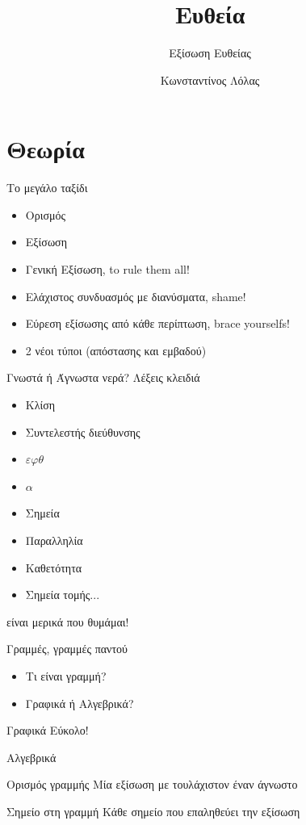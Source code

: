 \documentclass{presentation}
\title{Ευθεία}
\subtitle{Εξίσωση Ευθείας}
\author[Λόλας]{Κωνσταντίνος Λόλας}
\date{}
\begin{document}
\begin{frame}
  \titlepage
\end{frame}

\section{Θεωρία}

\begin{frame}{Το μεγάλο ταξίδι}
  \begin{itemize}[<+->]
    \item Ορισμός
    \item Εξίσωση
    \item Γενική Εξίσωση, to rule them all!
    \item Ελάχιστος συνδυασμός με διανύσματα, shame!
    \item Εύρεση εξίσωσης από κάθε περίπτωση, brace yourselfs!
    \item 2 νέοι τύποι (απόστασης και εμβαδού)
  \end{itemize}
\end{frame}

\begin{frame}{Γνωστά ή Άγνωστα νερά?}
  Λέξεις κλειδιά
  \begin{itemize}
    \item Κλίση
    \item Συντελεστής διεύθυνσης
    \item $εφθ$
    \item $α$
    \item Σημεία
    \item Παραλληλία
    \item Καθετότητα
    \item Σημεία τομής...
  \end{itemize}
  είναι μερικά που θυμάμαι!
\end{frame}

\begin{frame}{Γραμμές, γραμμές παντού}
  \begin{itemize}[<+->]
    \item Τι είναι γραμμή?
    \item Γραφικά ή Αλγεβρικά?
  \end{itemize}
\end{frame}

\begin{frame}{Γραφικά}
  Εύκολο!
\end{frame}

\begin{frame}{Αλγεβρικά}
  \begin{block}{Ορισμός γραμμής}
    Μία εξίσωση με τουλάχιστον έναν άγνωστο
  \end{block}
  \begin{block}{Σημείο στη γραμμή}
    Κάθε σημείο που επαληθεύει την εξίσωση
  \end{block}
\end{frame}
\end{document}
